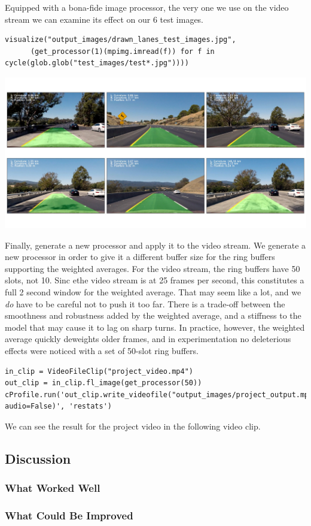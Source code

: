 \documentclass[11pt]{article}
\begin{document}
Equipped with a bona-fide image processor, the very one we use
on the video stream we can examine its effect on our 6 test images.

\begin{verbatim}
visualize("output_images/drawn_lanes_test_images.jpg", 
	  (get_processor(1)(mpimg.imread(f)) for f in cycle(glob.glob("test_images/test*.jpg"))))
\end{verbatim}

\includegraphics[width=.9\linewidth]{output_images/drawn_lanes_test_images.jpg}

Finally, generate a new processor and apply it to the video
stream.  We generate a new processor in order to give it a
different buffer size for the ring buffers supporting the
weighted averages.  For the video stream, the ring buffers have
50 slots, not 10.  Sinc ethe video stream is at 25 frames per
second, this constitutes a full 2 second window for the weighted
average.  That may seem like a lot, and we \emph{do} have to be
careful not to push it too far.  There is a trade-off between
the smoothness and robustness added by the weighted average, and
a stiffness to the model that may cause it to lag on sharp
turns.  In practice, however, the weighted average quickly
deweights older frames, and in experimentation no deleterious
effects were noticed with a set of 50-slot ring buffers.

\begin{verbatim}
in_clip = VideoFileClip("project_video.mp4")
out_clip = in_clip.fl_image(get_processor(50))
cProfile.run('out_clip.write_videofile("output_images/project_output.mp4", audio=False)', 'restats')
\end{verbatim}

We can see the result for the project video in the following
video clip.

\subsection*{Discussion}
\label{sec-2-3}

\subsubsection*{What Worked Well}
\label{sec-2-3-1}

\subsubsection*{What Could Be Improved}
\label{sec-2-3-2}
\end{document}
